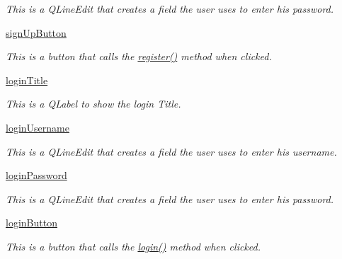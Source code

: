 \begin{DoxyCompactItemize}
\begin{DoxyCompactList}\small\item\em This is a Q\+Line\+Edit that creates a field the user uses to enter his password. \end{DoxyCompactList}\item 
\hyperlink{classsrc_1_1login__menu_1_1_login_menu_a2d518012477c43a0d5b77385e2e4209f}{sign\+Up\+Button}
\begin{DoxyCompactList}\small\item\em This is a button that calls the \hyperlink{classsrc_1_1login__menu_1_1_login_menu_af6ee6a8dee90f1a94a506400356707ad}{register()} method when clicked. \end{DoxyCompactList}\item 
\hyperlink{classsrc_1_1login__menu_1_1_login_menu_adce86324539cbf7d5a398d8afba6a439}{login\+Title}
\begin{DoxyCompactList}\small\item\em This is a Q\+Label to show the login Title. \end{DoxyCompactList}\item 
\hyperlink{classsrc_1_1login__menu_1_1_login_menu_a762640516f0435f5764308fd0f00a6c9}{login\+Username}
\begin{DoxyCompactList}\small\item\em This is a Q\+Line\+Edit that creates a field the user uses to enter his username. \end{DoxyCompactList}\item 
\hyperlink{classsrc_1_1login__menu_1_1_login_menu_a6c0c5ab8b48e62ccb26a472e6e7790c9}{login\+Password}
\begin{DoxyCompactList}\small\item\em This is a Q\+Line\+Edit that creates a field the user uses to enter his password. \end{DoxyCompactList}\item 
\hyperlink{classsrc_1_1login__menu_1_1_login_menu_a6e91fe2dc9a5b4bb26019242e84ce986}{login\+Button}
\begin{DoxyCompactList}\small\item\em This is a button that calls the \hyperlink{classsrc_1_1login__menu_1_1_login_menu_a75303935e17e43388fd4ef3df029944e}{login()} method when clicked. \end{DoxyCompactList}\end{DoxyCompactItemize}
